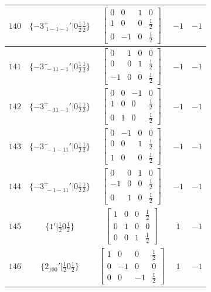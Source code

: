 \documentclass[fleqn,8pt]{jsarticle}
\begin{document}
\begin{longtable}{ccccc}
$ 140 $ & $ \{-3^{+}_{\,\,1-1-1}{}'|0 \frac{1}{2} \frac{1}{2}\} $ & $ \begin{bmatrix} 0 & 0 & 1 & 0 \\ 1 & 0 & 0 & \frac{1}{2} \\ 0 & -1 & 0 & \frac{1}{2} \end{bmatrix} $ & $ -1 $ & $ -1 $ \\ \hline
$ 141 $ & $ \{-3^{-}_{\,\,-11-1}{}'|0 \frac{1}{2} \frac{1}{2}\} $ & $ \begin{bmatrix} 0 & 1 & 0 & 0 \\ 0 & 0 & 1 & \frac{1}{2} \\ -1 & 0 & 0 & \frac{1}{2} \end{bmatrix} $ & $ -1 $ & $ -1 $ \\ \hline
$ 142 $ & $ \{-3^{+}_{\,\,-11-1}{}'|0 \frac{1}{2} \frac{1}{2}\} $ & $ \begin{bmatrix} 0 & 0 & -1 & 0 \\ 1 & 0 & 0 & \frac{1}{2} \\ 0 & 1 & 0 & \frac{1}{2} \end{bmatrix} $ & $ -1 $ & $ -1 $ \\ \hline
$ 143 $ & $ \{-3^{-}_{\,\,-1-11}{}'|0 \frac{1}{2} \frac{1}{2}\} $ & $ \begin{bmatrix} 0 & -1 & 0 & 0 \\ 0 & 0 & 1 & \frac{1}{2} \\ 1 & 0 & 0 & \frac{1}{2} \end{bmatrix} $ & $ -1 $ & $ -1 $ \\ \hline
$ 144 $ & $ \{-3^{+}_{\,\,-1-11}{}'|0 \frac{1}{2} \frac{1}{2}\} $ & $ \begin{bmatrix} 0 & 0 & 1 & 0 \\ -1 & 0 & 0 & \frac{1}{2} \\ 0 & 1 & 0 & \frac{1}{2} \end{bmatrix} $ & $ -1 $ & $ -1 $ \\ \hline
$ 145 $ & $ \{1{}'|\frac{1}{2} 0 \frac{1}{2}\} $ & $ \begin{bmatrix} 1 & 0 & 0 & \frac{1}{2} \\ 0 & 1 & 0 & 0 \\ 0 & 0 & 1 & \frac{1}{2} \end{bmatrix} $ & $ 1 $ & $ -1 $ \\ \hline
$ 146 $ & $ \{2{}_{100}{}'|\frac{1}{2} 0 \frac{1}{2}\} $ & $ \begin{bmatrix} 1 & 0 & 0 & \frac{1}{2} \\ 0 & -1 & 0 & 0 \\ 0 & 0 & -1 & \frac{1}{2} \end{bmatrix} $ & $ 1 $ & $ -1 $ \\ \hline

\end{longtable}
\end{document}
